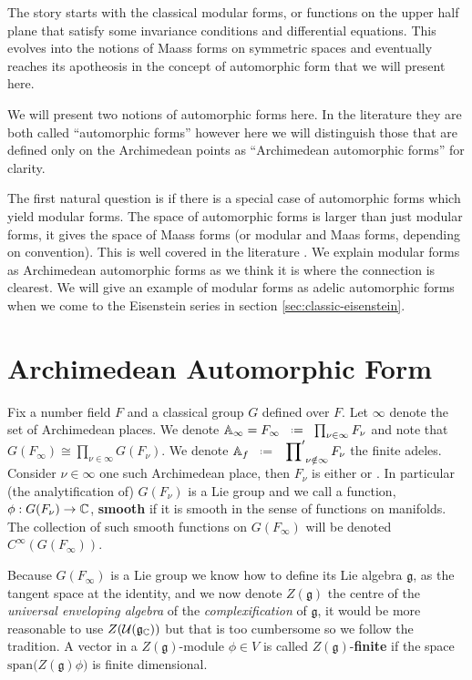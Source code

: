 
The story starts with the classical modular forms, or functions on the upper half plane that satisfy some invariance conditions and differential equations. This evolves into the notions of Maass forms on symmetric spaces and eventually reaches its apotheosis in the concept of automorphic form that we will present here. 

We will present two notions of automorphic forms here. In the literature they are both called ``automorphic forms'' however here we will distinguish those that are defined only on the Archimedean points as ``Archimedean automorphic forms'' for clarity.

The first natural question is if there is a special case of automorphic forms which yield modular forms. The space of automorphic forms is larger than just modular forms, it gives the space of Maass forms (or modular and Maas forms, depending on convention). This is well covered in the literature \cite{emertonCLASSICALMODULARFORMS}\cite[3.2]{bumpAutomorphicFormsRepresentations1997}\cite{booherVIEWINGMODULARFORMS}\cite{garrettTransitionEisensteinSeries2016}. We explain modular forms as Archimedean automorphic forms as we think it is where the connection is clearest. We will give an example of modular forms as adelic automorphic forms when we come to the Eisenstein series in section \ref{sec:classic-eisenstein}.




\section{Archimedean Automorphic Form}
Fix a number field \(F\) and a classical group \(G\) defined over \(F\). Let \(\infty\) denote the set of Archimedean places. We denote \(\A_\infty = F_\infty \defeq \prod_{\nu\in\infty} F_\nu\) and note that \(G(F_\infty) \cong \prod_{\nu\in\infty}G(F_\nu)\). We denote \(\A_f \defeq \sideset{}{'}\prod_{\nu\notin \infty} F_\nu\) the finite adeles. Consider \(\nu\in \infty\) one such Archimedean place, then \(F_\nu\) is either \R or \C. In particular (the analytification of) \(G(F_\nu)\) is a Lie group and we call a function, \(\phi: G(F_\nu) \to \C\), \textbf{smooth}  if it is smooth in the sense of functions on manifolds. The collection of such smooth functions on \(G(F_\infty)\) will be denoted \(C^\infty(G(F_\infty))\).

    Because \(G(F_\infty)\) is a Lie group we know how to define its Lie algebra \(\mathfrak{g}\), as the tangent space at the identity, and we now denote \(Z(\mathfrak{g})\) the centre of the \textit{universal enveloping algebra} of the \textit{complexification} of \(\mathfrak{g}\), it would be more reasonable to use \(Z(\mathcal{U}(\mathfrak{g}_{\C}))\) but that is too cumbersome so we follow the tradition. 
    A vector in a \(Z(\mathfrak{g})\)-module \(\phi\in V\) is called \(Z(\mathfrak{g})\)-\textbf{finite} if the space \(\mathrm{span} \big(Z(\mathfrak{g})\phi\big)\) is finite dimensional. 

